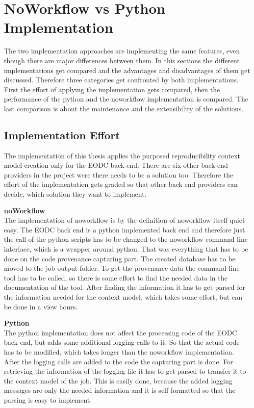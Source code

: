 \documentclass[draft,final]{vutinfth} %
\begin{document}

\section{NoWorkflow vs Python Implementation}\label{Evaluation:NvsP}
The two implementation approaches are implementing the same features, even though there are major differences between them. In this sections the different implementations get compared and the advantages and disadvantages of them get discussed. Therefore three categories get confronted by both implementations. First the effort of applying the implementation gets compared, then the performance of the python and the noworkflow implementation is compared. The last comparison is about the maintenance and the extensibility of the solutions. 

\subsection{Implementation Effort}\label{NvsP:Implementation Effort}
The implementation of this thesis applies the purposed reproducibility context model creation only for the EODC back end. There are six other back end providers in the project were there needs to be a solution too. Therefore the effort of the implementation gets graded so that other back end providers can decide, which solution they want to implement.

\textbf{noWorkflow} \\
The implementation of noworkflow is by the definition of noworkflow itself quiet easy. The EODC back end is a python implemented back end and therefore just the call of the python scripts has to be changed to the noworkflow command line interface, which is a wrapper around python. That was everything that has to be done on the code provenance capturing part. The created database has to be moved to the job output folder. To get the provenance data the command line tool has to be called, so there is some effort to find the needed data in the documentation of the tool. After finding the information it has to get parsed for the information needed for the context model, which takes some effort, but can be done in a view hours. 

\textbf{Python} \\
The python implementation does not affect the processing code of the EODC back end, but adds some additional logging calls to it. So that the actual code has to be modified, which takes longer than the noworkflow implementation. After the logging calls are added to the code the capturing part is done. For retrieving the information of the logging file it has to get parsed to transfer it to the context model of the job. This is easily done, because the added logging messages are only the needed information and it is self formatted so that the parsing is easy to implement.   
\end{document}
